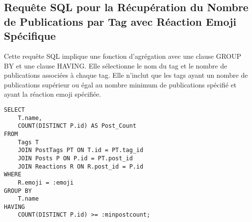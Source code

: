\subsection{Requête SQL pour la Récupération du Nombre de Publications par Tag avec Réaction Emoji Spécifique}

Cette requête SQL implique une fonction d'agrégation avec une clause GROUP BY et une clause HAVING. Elle sélectionne le nom du tag et le nombre de publications associées à chaque tag. Elle n'inclut que les tags ayant un nombre de publications supérieur ou égal au nombre minimum de publications spécifié et ayant la réaction emoji spécifiée.

\begin{lstlisting}
SELECT
    T.name,
    COUNT(DISTINCT P.id) AS Post_Count
FROM
    Tags T
    JOIN PostTags PT ON T.id = PT.tag_id
    JOIN Posts P ON P.id = PT.post_id
    JOIN Reactions R ON R.post_id = P.id
WHERE
    R.emoji = :emoji
GROUP BY
    T.name
HAVING
    COUNT(DISTINCT P.id) >= :minpostcount;
\end{lstlisting}
